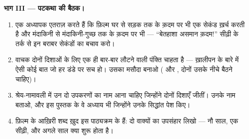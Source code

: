 \begin{problem}
\medskip\noindent\textbf{भाग III --- पटकथा की बैठक।}
\begin{enumerate}[resume]
  \item एक अध्यापक एतराज़ करते हैं कि फ़िल्म घर से सड़क तक के क़दम पर
        भी एक सेकंड ख़र्च करती है और मंदाकिनी से मंदाकिनी-गुच्छ तक के
        क़दम पर भी --- ``बेतहाशा असमान क़दम!'' सीढ़ी के तर्क से इन
        बराबर सेकंडों का बचाव करो।
  \item वाचक दोनों दिशाओं के लिए एक ही बार-बार लौटने वाली पंक्ति
        चाहता है --- ख़ालीपन के बारे में ऐसी कोई बात जो हर डंडे पर सच
        हो। उसका मसौदा बनाओ ( और , दोनों उसके नीचे बैठने
        चाहिए)।
  \item श्रेय-नामावली में उन दो उपकरणों का नाम आना चाहिए जिन्होंने
        दोनों दिशाएँ जीतीं। उनके नाम बताओ, और इस पुस्तक के वे अध्याय
        भी जिन्होंने उनके सिद्धांत पेश किए।
  \item फ़िल्म के आख़िरी शब्द ख़ुद इस पाठ्यक्रम के हैं: दो वाक्यों का
        उपसंहार लिखो --- नौ साल, एक सीढ़ी, और अगले साल क्या शुरू होता
        है।
\end{enumerate}
\end{problem}
